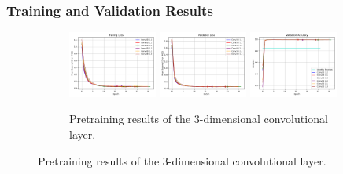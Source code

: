 \documentclass[./main.tex]{subfiles}
\begin{document}
\subsubsection{Training and Validation Results}
\begin{figure}[htbp]
    \centering
     \begin{subfigure}[b]{\textwidth}
         \centering
         \includegraphics[width=0.32\textwidth]{./entities/pretrain_res/baseline/train_losses.png}
         \includegraphics[width=0.32\textwidth]{./entities/pretrain_res/baseline/val_losses.png}
         \includegraphics[width=0.32\textwidth]{./entities/pretrain_res/baseline/val_accs.png}
         \caption{Pretraining results of the 3-dimensional convolutional layer.}
     \end{subfigure}
    \hfill


\end{figure}
\end{document}
